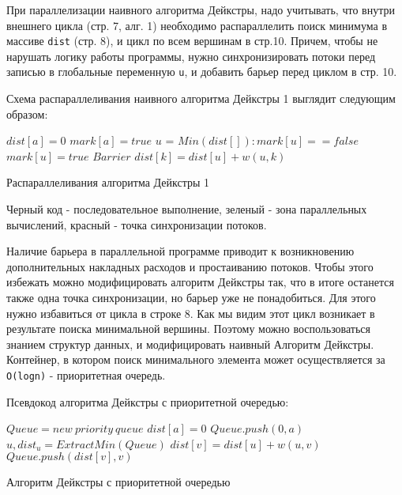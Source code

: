 \documentclass{article}
\newenvironment{myalgorithm}[1][htb]
  {\renewcommand{\algorithmcfname}{Алгоритм}
   \begin{algorithm}[#1]%
  }{\end{algorithm}}
\begin{document}
\par При параллелизации наивного алгоритма Дейкстры, надо учитывать, что внутри внешнего цикла (стр. 7, алг. 1) необходимо распараллелить поиск минимума в массиве \verb|dist| (стр. 8), и цикл по всем вершинам в стр.10. Причем, чтобы не нарушать логику работы программы, нужно синхронизировать потоки перед записью в глобальные переменную \verb|u|, и добавить барьер перед циклом в стр. 10.

\par Схема распараллеливания наивного алгоритма Дейкстры 1 выглядит следующим образом:    

\begin{myalgorithm}[H]
\SetAlgoLined
\BlankLine
$dist[a] = 0$\;
$mark[a] = true$\;
\BlankLine
{} {
 \textcolor{myred}{$u$ =} \textcolor{mygreen}{$Min(dist[]): mark[u] == false$\;}
 \textcolor{mygreen} {$mark[u] = true$\;}
 \textcolor{myred}{$Barrier$\;}
 \textcolor{mygreen} {
  {
 	 {
  	$dist[k] = dist[u] + w(u, k)$\;
  } } }
  }
\caption{Распараллеливания алгоритма Дейкстры 1}
\end{myalgorithm}

\par Черный код - последовательное выполнение, зеленый - зона параллельных вычислений, красный - точка синхронизации потоков. 

\par Наличие барьера в параллельной программе приводит к возникновению дополнительных накладных расходов и простаиванию потоков. Чтобы этого избежать можно модифицировать алгоритм Дейкстры так, что в итоге останется также одна точка синхронизации, но барьер уже не понадобиться. Для этого нужно избавиться от цикла в строке 8. Как мы видим этот цикл возникает в результате поиска минимальной вершины. Поэтому можно воспользоваться знанием структур данных, и модифицировать наивный Алгоритм Дейкстры. Контейнер, в котором поиск минимального элемента может осуществляется за \verb|O(logn)| - приоритетная очередь. 
\par Псевдокод алгоритма Дейкстры с приоритетной очередью: 

\begin{myalgorithm}[H]
\SetAlgoLined
{}
\BlankLine
$Queue = new\ priority\ queue$\;
$dist[a] = 0$\;
$Queue.push(0, a)$\;
 {
$u, dist_u = ExtractMin(Queue)$\;
\BlankLine
{} {
 {
 $dist[v] = dist[u] + w(u, v)$\;
 $Queue.push(dist[v], v)$\; } } }
\caption{Алгоритм Дейкстры с приоритетной очередью}
\end{myalgorithm}
\end{document}
